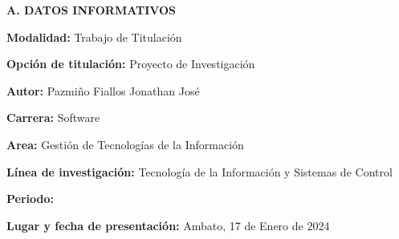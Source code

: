 


\setcounter{page}{2}

\tableofcontents
\pagebreak

\listoffigures
\pagebreak

\listoftables
\pagebreak

\begin{center}
	\textbf{A. DATOS INFORMATIVOS}
\end{center}\par
\textbf{Modalidad: } Trabajo de Titulación\par
\textbf{Opción de titulación: } Proyecto de Investigación\par
\textbf{Autor: } Pazmiño Fiallos Jonathan José\par
\textbf{Carrera: } Software\par
\textbf{Area: } Gestión de Tecnologías de la Información\par
\textbf{Línea de investigación: } Tecnología de la Información y Sistemas de Control\par
\textbf{Periodo: } \periodo\par
\textbf{Lugar y fecha de presentación: } Ambato,  17 de Enero de 2024
\pagebreak
